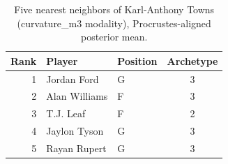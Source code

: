 \begin{table}[htbp]
  \centering\small
  \begin{tabular}{rllc}
    \toprule
    Rank & Player & Position & Archetype \\
    \midrule
    1 & Jordan Ford & G & 3 \\
    2 & Alan Williams & F & 3 \\
    3 & T.J. Leaf & F & 2 \\
    4 & Jaylon Tyson & G & 3 \\
    5 & Rayan Rupert & G & 3 \\
    \bottomrule
  \end{tabular}
  \caption{Five nearest neighbors of Karl-Anthony Towns (curvature_m3 modality), Procrustes-aligned posterior mean.}
  \label{tab:Karl_Anthony_Towns_neighbors_curvature_m3}
\end{table}

